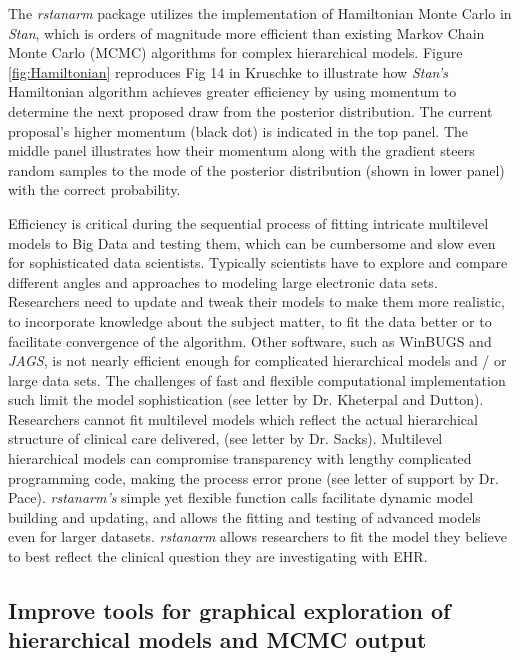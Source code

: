 \documentclass[11pt,notitlepage]{article}
\begin{document}
The \textit{rstanarm} package utilizes the implementation of Hamiltonian Monte Carlo
in \textit{Stan}, which is orders of magnitude more efficient than existing 
Markov Chain Monte Carlo (MCMC) algorithms for complex hierarchical models. Figure 
\ref{fig:Hamiltonian} reproduces Fig 14 in Kruschke \cite{Kruschke_Book_2014} to illustrate how 
\textit{Stan's} Hamiltonian algorithm achieves greater efficiency by using momentum to 
determine the next proposed draw from the posterior distribution. The current proposal's 
higher momentum (black dot) is indicated in the top panel. The middle panel illustrates how their 
momentum along with the gradient steers random samples to the mode of the posterior distribution (shown in lower 
panel) with the correct probability. 

Efficiency is critical during the sequential process of fitting intricate multilevel models to 
Big Data  and testing them, which can be cumbersome and slow even for sophisticated data scientists. 
Typically scientists have to explore and compare different 
angles and approaches to modeling large electronic data sets.  
Researchers need to update and tweak their models to make them more realistic, to 
incorporate knowledge about the subject matter, to fit the data better or 
to facilitate convergence of the algorithm. Other software, such as
WinBUGS and \textit{JAGS}, is not nearly efficient enough for complicated hierarchical models 
and / or large data sets. The challenges of fast 
and flexible computational implementation such limit the model sophistication 
(see letter by Dr. Kheterpal and Dutton). Researchers cannot fit multilevel 
models which reflect the actual hierarchical structure of clinical care delivered, 
(see letter by Dr. Sacks). Multilevel hierarchical models can compromise 
transparency with lengthy complicated programming code, making the process 
error prone (see letter of support by Dr. Pace). \textit{rstanarm's} simple 
yet flexible function calls facilitate dynamic model building and updating, 
and allows the fitting and testing of advanced models even for larger 
datasets. \textit{rstanarm} allows researchers to fit the model they 
believe to best reflect the clinical question they are investigating with EHR.

\subsection*{Improve tools for graphical exploration of hierarchical models and MCMC output}
\end{document}
